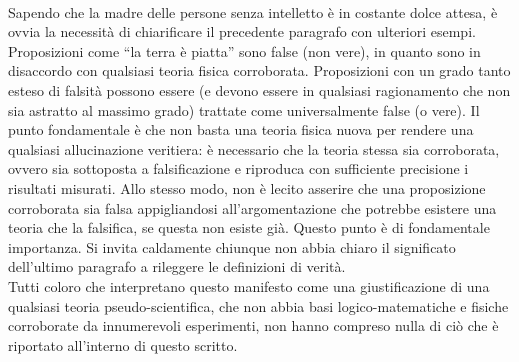 \documentclass[]{article}
\begin{document}
	\\
	Sapendo che la madre delle persone senza intelletto è in costante dolce attesa, è ovvia la necessità di chiarificare il precedente paragrafo con ulteriori esempi. Proposizioni come \enquote{la terra è piatta} sono false (non vere), in quanto sono in disaccordo con qualsiasi teoria fisica corroborata. Proposizioni con un grado tanto esteso di falsità possono essere (e devono essere in qualsiasi ragionamento che non sia astratto al massimo grado) trattate come universalmente false (o vere).
	Il punto fondamentale è che non basta una teoria fisica nuova per rendere una qualsiasi allucinazione veritiera: è necessario che la teoria stessa sia corroborata, ovvero sia sottoposta a falsificazione e riproduca con sufficiente precisione i risultati misurati. Allo stesso modo, non è lecito asserire che una proposizione corroborata sia falsa appigliandosi all'argomentazione che potrebbe esistere una teoria che la falsifica, se questa non esiste già. Questo punto è di fondamentale importanza.		
	Si invita caldamente chiunque non abbia chiaro il significato dell'ultimo paragrafo a rileggere le definizioni di verità.\\
	Tutti coloro che interpretano questo manifesto come una giustificazione di una qualsiasi teoria pseudo-scientifica, che non abbia basi logico-matematiche e fisiche corroborate da innumerevoli esperimenti, non hanno compreso nulla di ciò che è riportato all'interno di questo scritto.
\end{document}
